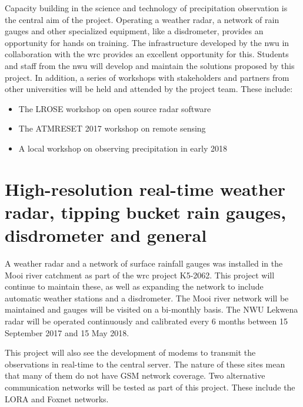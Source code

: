 \documentclass{wrcreport}
\begin{document}
Capacity building in the science and technology of precipitation
observation is the central aim of the project. Operating a weather
radar, a network of rain gauges and other specialized equipment, like
a disdrometer, provides an opportunity for hands on training. The
infrastructure developed by the \gls{nwu} in collaboration with the
\gls{wrc} provides an excellent opportunity for this. Students and
staff from the \gls{nwu} will develop and maintain the solutions
proposed by this project. In addition, a series of workshops with
stakeholders and partners from other universities will be held and
attended by the project team. These include:

\begin{itemize}
\item The LROSE workshop on open source radar software
\item The ATMRESET 2017 workshop on remote sensing
\item A local workshop on observing precipitation in early 2018
\end{itemize}

\section{High-resolution real-time weather radar, tipping bucket rain gauges, disdrometer and general}

A weather radar and a network of surface rainfall gauges was installed
in the Mooi river catchment as part of the \gls{wrc} project K5-2062.
This project will continue to maintain these, as well as expanding the
network to include automatic weather stations and a disdrometer. The
Mooi river network will be maintained and gauges will be visited on a
bi-monthly basis. The NWU Lekwena radar will be operated continuously
and calibrated every 6 months between 15 September 2017 and 15 May
2018.

This project will also see the development of modems to transmit the
observations in real-time to the central server. The nature of these
sites mean that many of them do not have GSM network coverage. Two
alternative communication networks will be tested as part of this
project. These include the LORA and Foxnet networks.
\end{document}
